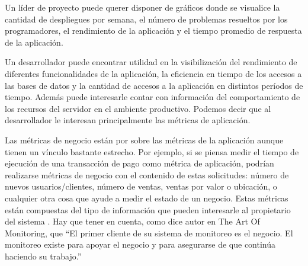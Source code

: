Un líder de proyecto puede querer disponer de gráficos donde se visualice la cantidad de despliegues por semana, el número de problemas resueltos por los programadores, el rendimiento de la aplicación y el tiempo promedio de respuesta de la aplicación.

Un desarrollador puede encontrar utilidad en la visibilización del rendimiento de diferentes funcionalidades de la aplicación, la eficiencia en tiempo de los accesos a las bases de datos y la cantidad de accesos a la aplicación en distintos períodos de tiempo. Además puede interesarle contar con información del comportamiento de los recursos del servidor en el ambiente productivo. Podemos decir que al desarrollador le interesan principalmente las métricas de aplicación.

Las métricas de negocio están por sobre las métricas de la aplicación aunque tienen un vínculo bastante estrecho. Por ejemplo, si se piensa medir el tiempo de ejecución de una transacción de pago como métrica de aplicación, podrían realizarse métricas de negocio con el contenido de estas solicitudes: número de nuevos usuarios/clientes, número de ventas, ventas por valor o ubicación, o cualquier otra cosa que ayude a medir el estado de un negocio. Estas métricas están compuestas del tipo de información que pueden interesarle al propietario del sistema \cite[p.~446]{monitoreo:art_of_monitoring}. Hay que tener en cuenta, como dice autor en The Art Of Monitoring, que “El primer cliente de su sistema de monitoreo es el negocio. El monitoreo existe para apoyar el negocio y para asegurarse de que continúa haciendo su trabajo.” \cite[p.~8]{monitoreo:art_of_monitoring}

